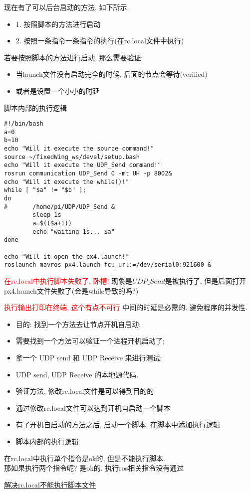 现在有了可以后台启动的方法, 如下所示. 
\begin{itemize}
    \item 1. 按照脚本的方法进行启动
    \item 2. 按照一条指令一条指令的执行(在rc.local文件中执行)
\end{itemize}
若要按照脚本的方法进行启动, 那么需要验证:
\begin{itemize}
    \item 当launch文件没有启动完全的时候, 后面的节点会等待(verified)
    \item 或者是设置一个小小的时延
\end{itemize}

脚本内部的执行逻辑
\begin{lstlisting}
#!/bin/bash
a=0
b=10
echo "Will it execute the source command!"
source ~/fixedWing_ws/devel/setup.bash
echo "Will it execute the UDP_Send command!"
rosrun communication UDP_Send 0 -mt UH -p 8002&
echo "Will it execute the while()!"
while [ "$a" != "$b" ];
do
#       /home/pi/UDP/UDP_Send &
        sleep 1s
        a=$(($a+1))
        echo "waiting 1s... $a"
done

echo "Will it open the px4.launch!"
roslaunch mavros px4.launch fcu_url:=/dev/serial0:921600 &
\end{lstlisting}


\textcolor{red}{在rc.local中执行脚本失败了, 卧槽!} 
现象是$UDP\_Send$是被执行了,
但是后面打开px4.launch文件失败了(会是while导致的吗?)

\textcolor{red}{执行输出打印在终端, 这个有点不可行}
中间的时延是必需的. 避免程序的并发性. 

\begin{itemize}
    \item 目的: 找到一个方法去让节点开机自启动; 
    \item 需要找到一个方法可以验证一个进程开机启动了; 
    \item 拿一个 UDP send 和 UDP Receive 来进行测试; 
    \item UDP send, UDP Receive 的本地源代码. 
    \item 验证方法, 修改rc.local文件是可以得到目的的
    \item 通过修改rc.local文件可以达到开机自启动一个脚本
    \item 有了开机自启动的方法之后, 启动一个脚本, 在脚本中添加执行逻辑
    \item 脚本内部的执行逻辑
\end{itemize}

在rc.local中执行单个指令是ok的, 但是不能执行脚本.\\ 
那如果执行两个指令呢? 是ok的.
执行ros相关指令没有通过

\href{https://blog.csdn.net/liuwinner/article/details/91040565}{解决rc.local不能执行脚本文件}

